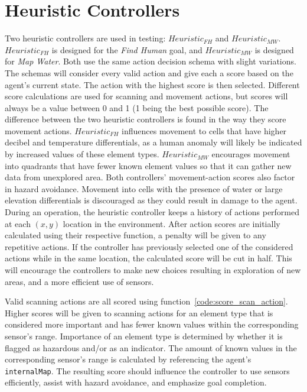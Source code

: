 \section{Heuristic Controllers} \label{sec:heuristic_controllers}
Two heuristic controllers are used in testing: $Heuristic_{FH}$ and $Heuristic_{MW}$.
$Heuristic_{FH}$ is designed for the \textit{Find Human} goal, and $Heuristic_{MW}$ is designed for \textit{Map Water}.
Both use the same action decision schema with slight variations.
The schemas will consider every valid action and give each a score based on the agent's current state.
The action with the highest score is then selected.
Different score calculations are used for scanning and movement actions, but scores will always be a value between 0 and 1 (1 being the best possible score).
The difference between the two heuristic controllers is found in the way they score movement actions.
$Heuristic_{FH}$ influences movement to cells that have higher decibel and temperature differentials, as a human anomaly will likely be indicated by increased values of these element types.
$Heuristic_{MW}$ encourages movement into quadrants that have fewer known element values so that it can gather new data from unexplored area.
Both controllers' movement-action scores also factor in hazard avoidance.
Movement into cells with the presence of water or large elevation differentials is discouraged as they could result in damage to the agent.
During an operation, the heuristic controller keeps a history of actions performed at each $(x,y)$ location in the environment.
After action scores are initially calculated using their respective function, a penalty will be given to any repetitive actions.
If the controller has previously selected one of the considered actions while in the same location, the calculated score will be cut in half.
This will encourage the controllers to make new choices resulting in exploration of new areas, and a more efficient use of sensors.

Valid scanning actions are all scored using function~\ref{code:score_scan_action}.
Higher scores will be given to scanning actions for an element type that is considered more important and has fewer known values within the corresponding sensor's range.
Importance of an element type is determined by whether it is flagged as hazardous and/or as an indicator.
The amount of known values in the corresponding sensor's range is calculated by referencing the agent's \texttt{internalMap}.
The resulting score should influence the controller to use sensors efficiently, assist with hazard avoidance, and emphasize goal completion.

